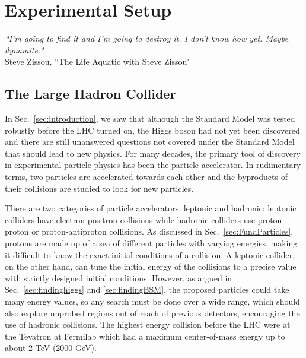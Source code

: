 \chapter{Experimental Setup}
\label{sec:expt}

\begin{center}
\begin{footnotesize}
{\it{``I'm going to find it and I'm going to destroy it. I don't know how yet. Maybe dynamite."}}\\
Steve Zissou, ``The Life Aquatic with Steve Zissou"
\end{footnotesize}
\end{center}

\section{The Large Hadron Collider}
\label{sec:LHC}

In Sec.~\ref{sec:introduction}, we saw that although the Standard Model was tested robustly before the LHC turned on, the Higgs boson had not yet been discovered and there are still unanswered questions not covered under the Standard Model that should lead to new physics. For many decades, the primary tool of discovery in experimental particle physics has been the particle accelerator. In rudimentary terms, two particles are accelerated towards each other and the byproducts of their collisions are studied to look for new particles.

There are two categories of particle accelerators, leptonic and hadronic: leptonic colliders have electron-positron collisions while hadronic colliders use proton-proton or proton-antiproton collisions. As discussed in Sec.~\ref{sec:FundParticles}, protons are made up of a sea of different particles with varying energies, making it difficult to know the exact initial conditions of a collision. A leptonic collider, on the other hand, can tune the initial energy of the collisions to a precise value with strictly designed initial conditions. However, as argued in Sec.~\ref{sec:findinghiggs} and \ref{sec:findingBSM}, the proposed particles could take many energy values, so any search must be done over a wide range, which should also explore unprobed regions out of reach of previous detectors, encouraging the use of hadronic collisions. The highest energy collision before the LHC were at the Tevatron at Fermilab which had a maximum center-of-mass energy up to about 2 TeV (2000 GeV).

